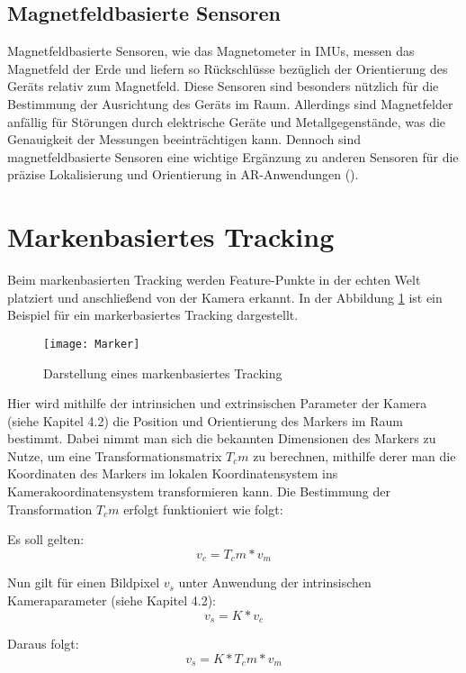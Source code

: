 \subsection{Magnetfeldbasierte Sensoren}

Magnetfeldbasierte Sensoren, wie das Magnetometer in IMUs, messen das Magnetfeld der Erde und liefern so Rückschlüsse bezüglich der Orientierung des Geräts relativ zum Magnetfeld. Diese Sensoren sind besonders nützlich für die Bestimmung der Ausrichtung des Geräts im Raum. Allerdings sind Magnetfelder anfällig für Störungen durch elektrische Geräte und Metallgegenstände, was die Genauigkeit der Messungen beeinträchtigen kann. Dennoch sind magnetfeldbasierte Sensoren eine wichtige Ergänzung zu anderen Sensoren für die präzise Lokalisierung und Orientierung in AR-Anwendungen (\cite{doerner2022virtual}).

\section{Markenbasiertes Tracking}\label{Markerbasiertes Tracking}

Beim markenbasierten Tracking werden Feature-Punkte in der echten Welt platziert und anschließend von der Kamera erkannt. In der Abbildung \ref{fig:Marker} ist ein Beispiel für ein markerbasiertes Tracking dargestellt. 

\begin{figure}
    \centering
    \texttt{[image: Marker]}
    \caption{Darstellung eines markenbasiertes Tracking\label{fig:Marker}}\par
\end{figure}

Hier wird mithilfe der intrinsichen und extrinsischen Parameter der Kamera (siehe Kapitel 4.2) die Position und Orientierung des Markers im Raum bestimmt. Dabei nimmt man sich die bekannten Dimensionen des Markers zu Nutze, um eine Transformationsmatrix \(T_cm\) zu berechnen, mithilfe derer man die Koordinaten des Markers im lokalen Koordinatensystem ins Kamerakoordinatensystem transformieren kann. Die Bestimmung der Transformation \(T_cm\) erfolgt funktioniert wie folgt:

Es soll gelten:
\[ v_c = T_cm * v_m \]

Nun gilt für einen Bildpixel \(v_s\) unter Anwendung der intrinsischen Kameraparameter (siehe Kapitel 4.2):
\[ v_s = K * v_c \]

Daraus folgt:
\[ v_s = K * T_cm * v_m \]

